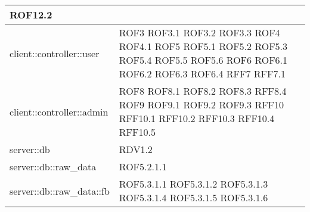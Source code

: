 \begin{center}
\begin{longtable}{| p{9cm} | p{4cm} |}
\newline ROF12.2 \\
\hline
client::controller::user  &  ROF3 \newline ROF3.1 \newline ROF3.2 \newline ROF3.3 \newline ROF4 \newline ROF4.1 \newline ROF5 \newline ROF5.1 \newline ROF5.2 \newline ROF5.3 \newline ROF5.4 \newline ROF5.5  \newline ROF5.6 \newline ROF6 \newline ROF6.1 \newline ROF6.2 \newline ROF6.3 \newline ROF6.4 \newline RFF7 \newline RFF7.1 \\
\hline
client::controller::admin  &  ROF8 \newline ROF8.1 \newline ROF8.2 \newline ROF8.3 \newline RFF8.4 \newline ROF9 \newline ROF9.1 \newline ROF9.2 \newline ROF9.3 \newline RFF10 \newline RFF10.1 \newline RFF10.2 \newline RFF10.3 \newline RFF10.4 \newline RFF10.5 \\
\hline
server::db  & RDV1.2 \\
\hline
server::db::raw\_data  &  ROF5.2.1.1 \\
\hline
server::db::raw\_data::fb  & ROF5.3.1.1 \newline ROF5.3.1.2 \newline ROF5.3.1.3 \newline ROF5.3.1.4 \newline ROF5.3.1.5 \newline ROF5.3.1.6  \\

\end{longtable}
\end{center}
